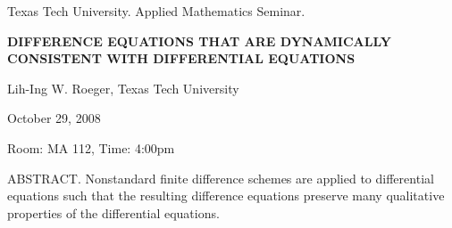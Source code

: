 \documentclass[oneside]{amsart}
\begin{document}
\begin{center}
Texas Tech University. Applied Mathematics Seminar.

\end{center}

\begin{center}

{\LARGE \uppercase{\textbf{Difference Equations that are Dynamically Consistent with Differential Equations}}}

Lih-Ing W. Roeger, Texas Tech University

October 29, 2008

Room: MA 112, Time: 4:00pm

\end{center}


ABSTRACT. Nonstandard finite difference schemes are applied to differential equations such that the resulting difference equations preserve many qualitative properties of the differential equations.
\end{document}
